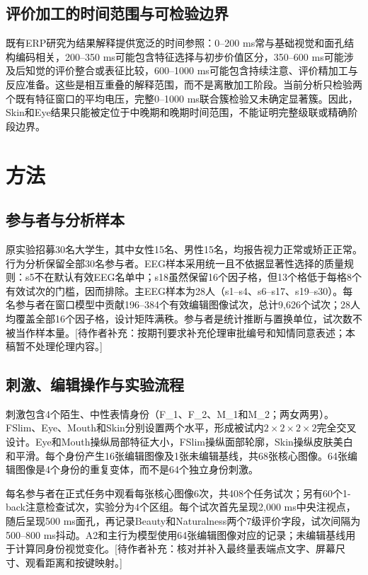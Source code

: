 \documentclass[preprint,12pt,authoryear]{elsarticle}
\newcommand{\todo}[1]{\textcolor{red!70!black}{[待作者补充：#1]}}
\begin{document}
\subsection{评价加工的时间范围与可检验边界}

既有ERP研究为结果解释提供宽泛的时间参照：0--200 ms常与基础视觉和面孔结构编码相关，200--350 ms可能包含特征选择与初步价值区分，350--600 ms可能涉及后知觉的评价整合或表征比较，600--1000 ms可能包含持续注意、评价精加工与反应准备\citep{Schacht2008,Revers2023,Han2022}。这些是相互重叠的解释范围，而不是离散加工阶段。当前分析只检验两个既有特征窗口的平均电压，完整0--1000 ms联合簇检验又未确定显著簇。因此，Skin和Eye结果只能被定位于中晚期和晚期时间范围，不能证明完整级联或精确阶段边界。

\section{方法}

\subsection{参与者与分析样本}

原实验招募30名大学生，其中女性15名、男性15名，均报告视力正常或矫正正常。行为分析保留全部30名参与者。EEG样本采用统一且不依据显著性选择的质量规则：s5不在默认有效EEG名单中；s18虽然保留16个因子格，但13个格低于每格8个有效试次的门槛，因而排除。主EEG样本为28人（s1--s4、s6--s17、s19--s30）。每名参与者在窗口模型中贡献196--384个有效编辑图像试次，总计9,626个试次；28人均覆盖全部16个因子格，设计矩阵满秩。参与者是统计推断与置换单位，试次数不被当作样本量。\todo{按期刊要求补充伦理审批编号和知情同意表述；本稿暂不处理伦理内容。}

\subsection{刺激、编辑操作与实验流程}

刺激包含4个陌生、中性表情身份（F\_1、F\_2、M\_1和M\_2；两女两男）。FSlim、Eye、Mouth和Skin分别设置两个水平，形成被试内$2\times2\times2\times2$完全交叉设计。Eye和Mouth操纵局部特征大小，FSlim操纵面部轮廓，Skin操纵皮肤美白和平滑。每个身份产生16张编辑图像及1张未编辑基线，共68张核心图像。64张编辑图像是4个身份的重复变体，而不是64个独立身份刺激。

每名参与者在正式任务中观看每张核心图像6次，共408个任务试次；另有60个1-back注意检查试次，实验分为4个区组。每个试次首先呈现2,000 ms中央注视点，随后呈现500 ms面孔，再记录Beauty和Naturalness两个7级评价字段，试次间隔为500--800 ms抖动。A2和主行为模型使用64张编辑图像对应的记录；未编辑基线用于计算同身份视觉变化。\todo{核对并补入最终量表端点文字、屏幕尺寸、观看距离和按键映射。}
\end{document}
